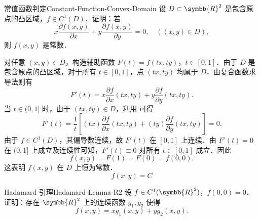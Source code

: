 \begin{problem}{常值函数判定}{Constant-Function-Convex-Domain}
    设 $D \subset \symbb{R}^2$ 是包含原点的凸区域，$f \in C^1(D)$．证明：若
    \begin{equation}
        x \frac{\partial f(x,y)}{\partial x} + y \frac{\partial f(x,y)}{\partial y} = 0, \quad ((x,y) \in D), \label{eq:Euler-PDE}
    \end{equation}
    则 $f(x,y)$ 是常数．
\end{problem}

\begin{myproof}
    对任意 $(x, y) \in D$，构造辅助函数 $F(t) = f(tx, ty)$，$t \in [0, 1]$．由于 $D$ 是包含原点的凸区域，对于所有 $t \in [0, 1]$，点 $(tx, ty)$ 均属于 $D$．由复合函数求导法则有
    \begin{equation}
        F'(t) = x \frac{\partial f}{\partial x}(tx, ty) + y \frac{\partial f}{\partial y}(tx, ty).
    \end{equation}
    当 $t \in (0, 1]$ 时，由于 $(tx, ty) \in D$，利用  可得
    \begin{equation}
        F'(t) = \frac{1}{t} \left[ (tx) \frac{\partial f}{\partial x}(tx, ty) + (ty) \frac{\partial f}{\partial y}(tx, ty) \right] = 0.
    \end{equation}
    由于 $f \in C^1(D)$，其偏导数连续，故 $F'(t)$ 在 $[0, 1]$ 上连续．由 $F'(t) = 0$ 在 $(0, 1]$ 上成立及连续性可知，$F'(t) \equiv 0$ 对所有 $t \in [0, 1]$ 成立．因此
    \begin{equation}
        f(x, y) = F(1) = F(0) = f(0, 0).
    \end{equation}
    这表明 $f(x, y)$ 在 $D$ 上恒为常数．
    \begin{equation}
        \boxed{f(x, y) = C}
    \end{equation}
\end{myproof}


\begin{problem}{Hadamard 引理}{Hadamard-Lemma-R2}
    设 $f \in C^1(\symbb{R}^2)$，$f(0,0) = 0$．证明：存在 $\symbb{R}^2$ 上的连续函数 $g_1, g_2$ 使得
    \begin{equation}
        f(x,y) = x g_1(x,y) + y g_2(x,y).
    \end{equation}
\end{problem}

